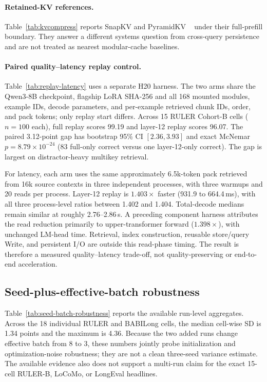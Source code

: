 \paragraph{Retained-KV references.}
Table~\ref{tab:kvcompress} reports SnapKV and PyramidKV
~\citep{snapkv,pyramidkv} under their full-prefill boundary. They answer a
different systems question from cross-query persistence and are not treated as
nearest modular-cache baselines.



\paragraph{Paired quality--latency replay control.}
Table~\ref{tab:replay-latency} uses a separate H20 harness. The two arms share
the Qwen3-8B checkpoint, flagship LoRA SHA-256 and all 168 mounted modules,
example IDs, decode parameters, and per-example retrieved chunk IDs, order, and
pack tokens; only replay start differs. Across 15 RULER Cohort-B cells
($n{=}100$ each), full replay scores 99.19 and layer-12 replay scores 96.07.
The paired 3.12-point gap has bootstrap 95\% CI $[2.36,3.93]$ and exact McNemar
$p{=}8.79\!\times\!10^{-24}$ (83 full-only correct versus one layer-12-only
correct). The gap is largest on distractor-heavy multikey retrieval.

For latency, each arm uses the same approximately 6.5k-token pack retrieved from
16k source contexts in three independent
processes, with three warmups and 20 reads per process. Layer-12 replay is
$1.403\times$ faster (931.9 to 664.4\,ms), with all three process-level ratios
between 1.402 and 1.404. Total-decode medians remain similar at roughly
2.76--2.86\,s. A preceding component harness attributes the read reduction
primarily to upper-transformer forward ($1.398\times$), with unchanged LM-head
time. Retrieval, index construction, reusable store/query Write, and persistent
I/O are outside this read-phase timing. The result is therefore a measured
quality--latency trade-off, not quality-preserving or end-to-end acceleration.





\subsection{Seed-plus-effective-batch robustness}

Table~\ref{tab:seed-batch-robustness} reports the available run-level
aggregates. Across the 18 individual RULER and BABILong cells, the median
cell-wise SD is 1.34 points and the maximum is 4.36. Because the two added runs
change effective batch from 8 to 3, these numbers jointly probe initialization
and optimization-noise robustness; they are not a clean three-seed variance
estimate. The available evidence also does not support a multi-run claim for the
exact 15-cell RULER-B, LoCoMo, or LongEval headlines.

